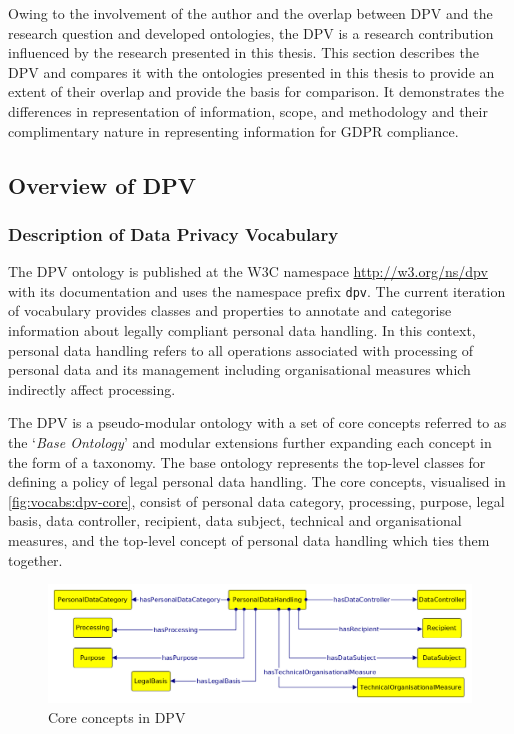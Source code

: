 Owing to the involvement of the author and the overlap between DPV and the research question and developed ontologies, the DPV is a research contribution influenced by the research presented in this thesis.
This section describes the DPV and compares it with the ontologies presented in this thesis to provide an extent of their overlap and provide the basis for comparison.
It demonstrates the differences in representation of information, scope, and methodology and their complimentary nature in representing information for GDPR compliance.

\subsection{Overview of DPV}
\subsubsection{Description of Data Privacy Vocabulary}
The DPV ontology is published at the W3C namespace \url{http://w3.org/ns/dpv} with its documentation and uses the namespace prefix \texttt{dpv}. 
The current iteration of vocabulary provides classes and properties to annotate and categorise information about legally compliant personal data handling. In this context, personal data handling refers to all operations associated with processing of personal data and its management including organisational measures which indirectly affect processing.

The DPV is a pseudo-modular ontology with a set of core concepts referred to as the `\textit{Base Ontology}' and modular extensions further expanding each concept in the form of a taxonomy. The base ontology represents the top-level classes for defining a policy of legal personal data handling.
The core concepts, visualised in \autoref{fig:vocabs:dpv-core}, consist of personal data category, processing, purpose, legal basis, data controller, recipient, data subject, technical and organisational measures, and the top-level concept of personal data handling which ties them together.

\begin{figure}[htbp]
    \centering
    \includegraphics[width=\linewidth]{img/dpv-personaldatahandling.png}
    \caption{Core concepts in DPV \cite{}}
    \label{fig:vocabs:dpv-core}
\end{figure}

